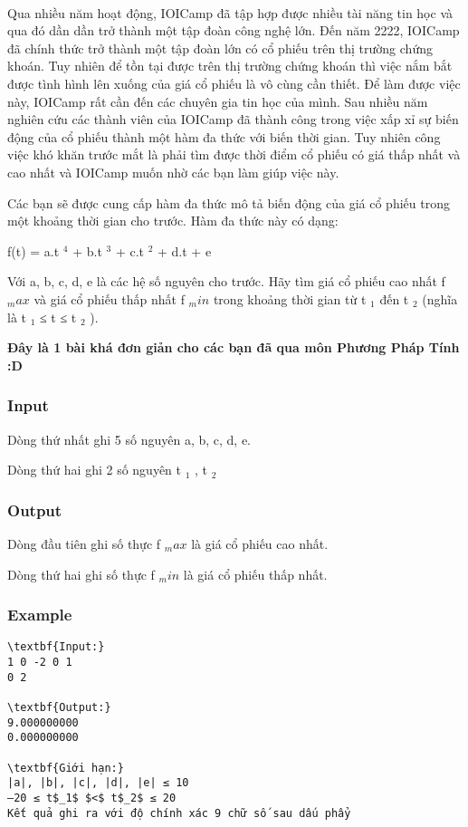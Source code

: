 

 

Qua nhiều năm hoạt động, IOICamp đã tập hợp được nhiều tài năng tin học và qua đó dần dần trở thành một tập đoàn công nghệ lớn. Đến năm 2222, IOICamp đã chính thức trở thành một tập đoàn lớn có cổ phiếu trên thị trường chứng khoán. Tuy nhiên để tồn tại được trên thị trường chứng khoán thì việc nắm bắt được tình hình lên xuống của giá cổ phiếu là vô cùng cần thiết. Để làm được việc này, IOICamp rất cần đến các chuyên gia tin học của mình. Sau nhiều năm nghiên cứu các thành viên của IOICamp đã thành công trong việc xấp xỉ sự biến động của cổ phiếu thành một hàm đa thức với biến thời gian. Tuy nhiên công việc khó khăn trước mắt là phải tìm được thời điểm cổ phiếu có giá thấp nhất và cao nhất và IOICamp muốn nhờ các bạn làm giúp việc này.

Các bạn sẽ được cung cấp hàm đa thức mô tả biến động của giá cổ phiếu trong một khoảng thời gian cho trước. Hàm đa thức này có dạng:

f(t) = a.t $^ 4 $ + b.t $^ 3 $ + c.t $^ 2 $ + d.t + e

Với a, b, c, d, e là các hệ số nguyên cho trước. Hãy tìm giá cổ phiếu cao nhất f $_ max $ và giá cổ phiếu thấp nhất f $_ min $ trong khoảng thời gian từ t $_ 1 $ đến t $_ 2 $ (nghĩa là t $_ 1 $ ≤ t ≤ t $_ 2 $ ).

\textbf{Đ}\textbf{ây là 1 bài khá đơn giản cho các bạn đã qua môn Phương Pháp Tính :D }

\subsubsection{Input}

Dòng thứ nhất ghi 5 số nguyên a, b, c, d, e.

Dòng thứ hai ghi 2 số nguyên t $_ 1 $ , t $_ 2 $

\subsubsection{Output}

Dòng đầu tiên ghi số thực f $_ max $ là giá cổ phiếu cao nhất.

Dòng thứ hai ghi số thực f $_ min $ là giá cổ phiếu thấp nhất.

\subsubsection{Example}
\begin{verbatim}
\textbf{Input:}
1 0 -2 0 1
0 2

\textbf{Output:}
9.000000000
0.000000000

\textbf{Giới hạn:}
|a|, |b|, |c|, |d|, |e| ≤ 10
–20 ≤ t$_1$ $<$ t$_2$ ≤ 20
Kết quả ghi ra với độ chính xác 9 chữ số sau dấu phẩy
\end{verbatim}